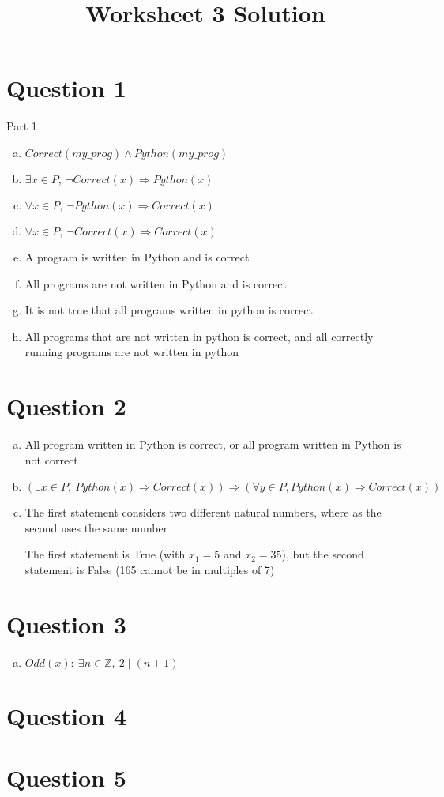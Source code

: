 \documentclass[12pt]{article}
\begin{document}
\title{Worksheet 3 Solution}
\maketitle

\section*{Question 1}

Part 1
\begin{enumerate}[a)]
    \item
        $Correct(my\_prog) \land Python(my\_prog)$
    \item
        $\exists x \in P,\: \neg Correct(x) \Rightarrow Python(x)$
    \item
        $\forall x \in P,\: \neg Python(x) \Rightarrow Correct(x)$
    \item
        $\forall x \in P,\: \neg Correct(x) \Rightarrow Correct(x)$
    \item
        A program is written in Python and is correct
    \item
        All programs are not written in Python and is correct
    \item
        It is not true that all programs written in python is correct
    \item
        All programs that are not written in python is correct, and all correctly running programs are not written in python

\end{enumerate}

\section*{Question 2}

\begin{enumerate}[a)]
    \item
        All program written in Python is correct, or all program written in Python is not correct
    \item
        $(\exists x \in P,\: Python(x) \Rightarrow Correct(x)) \Rightarrow (\forall y \in P, Python(x) \Rightarrow Correct(x))$
    \item
        The first statement considers two different natural numbers, where as the second uses the same number

        The first statement is True (with $x_1 = 5$ and $x_2 = 35$), but the second statement is False (165 cannot be in multiples of 7)
\end{enumerate}

\section*{Question 3}

\begin{enumerate}[a)]
    \item
        $Odd(x):\: \exists n \in \mathbb{Z},\: 2 \mid (n+1)$
\end{enumerate}


\section*{Question 4}

\section*{Question 5}
\end{document}
